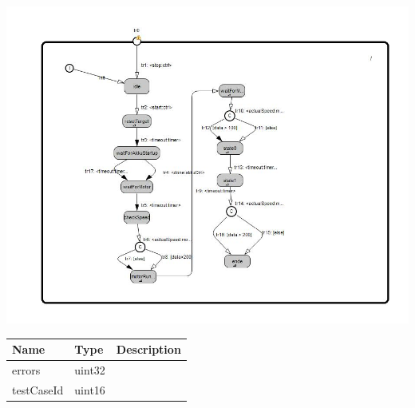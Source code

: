 {
\centering{}
\includegraphics[width=1.0\textwidth]{./images/AEloTempTest_behavior.jpg}
}

\begin{par}

\end{par}


\begin{tabular}[ht]{|l|l|p{8cm}|}
\hline
\textbf{Name} & \textbf{Type} & \textbf{Description}\\
\hline
errors & uint32 & \\
\hline
testCaseId & uint16 & \\
\hline
\end{tabular}

